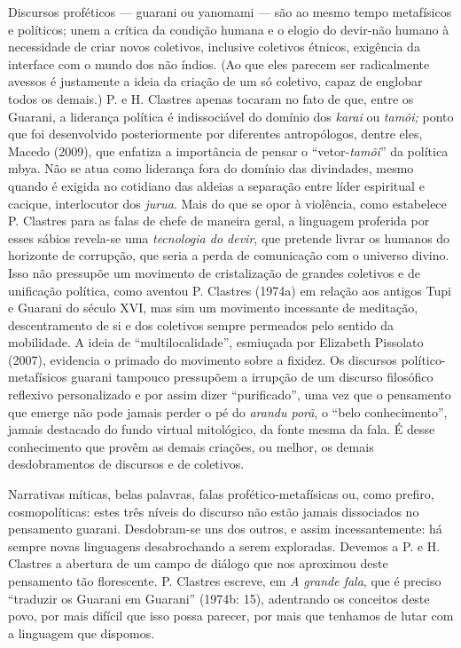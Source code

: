 Discursos proféticos --- guarani ou yanomami --- são ao mesmo tempo
metafísicos e políticos; unem a crítica da condição humana e o elogio do
devir-não humano à necessidade de criar novos coletivos, inclusive
coletivos étnicos, exigência da interface com o mundo dos não índios.
(Ao que eles parecem ser radicalmente avessos é justamente a ideia da
criação de um só coletivo, capaz de englobar todos os demais.) P. e H.
Clastres apenas tocaram no fato de que, entre os Guarani, a liderança
política é indissociável do domínio dos \emph{karai} ou \emph{tamõi;}
ponto que foi desenvolvido posteriormente por diferentes antropólogos,
dentre eles, Macedo (2009), que enfatiza a importância de pensar o
``vetor-\emph{tamõi}'' da política mbya. Não se atua como liderança fora
do domínio das divindades, mesmo quando é exigida no cotidiano das
aldeias a separação entre líder espiritual e cacique, interlocutor dos
\emph{jurua}. Mais do que se opor à violência, como estabelece P.
Clastres para as falas de chefe de maneira geral, a linguagem proferida
por esses sábios revela-se uma \emph{tecnologia do devir}, que pretende
livrar os humanos do horizonte de corrupção, que seria a perda de
comunicação com o universo divino. Isso não pressupõe um movimento de
cristalização de grandes coletivos e de unificação política, como
aventou P. Clastres (1974a) em relação aos antigos Tupi e Guarani do
século XVI, mas sim um movimento incessante de meditação, descentramento
de si e dos coletivos sempre permeados pelo sentido da mobilidade. A
ideia de ``multilocalidade'', esmiuçada por Elizabeth Pissolato (2007),
evidencia o primado do movimento sobre a fixidez. Os discursos
político-metafísicos guarani tampouco pressupõem a irrupção de um
discurso filosófico reflexivo personalizado e por assim dizer
``purificado'', uma vez que o pensamento que emerge não pode jamais
perder o pé do \emph{arandu porã}, o ``belo conhecimento'', jamais
destacado do fundo virtual mitológico, da fonte mesma da fala. É desse
conhecimento que provêm as demais criações, ou melhor, os demais
desdobramentos de discursos e de coletivos.

Narrativas míticas, belas palavras, falas profético-metafísicas ou, como
prefiro, cosmopolíticas: estes três níveis do discurso não estão jamais
dissociados no pensamento guarani. Desdobram-se uns dos outros, e assim
incessantemente: há sempre novas linguagens desabrochando a serem
exploradas. Devemos a P. e H. Clastres a abertura de um campo de diálogo
que nos aproximou deste pensamento tão florescente. P. Clastres escreve,
em \emph{A grande fala}, que é preciso ``traduzir os Guarani em
Guarani'' (1974b: 15), adentrando os conceitos deste povo, por mais
difícil que isso possa parecer, por mais que tenhamos de lutar com a
linguagem que dispomos.

